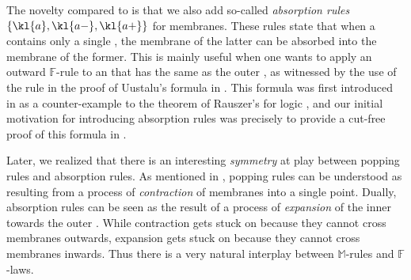 \begin{description}
  The novelty compared to  is that we also add so-called
  \emph{absorption rules} $\{\kl{a},\kl{a{-}},\kl{a{+}}\}$ for membranes.
  These rules state that when a  contains only a single  ,
  the membrane of the latter can be absorbed into the membrane of the former.
  This is mainly useful when one wants to apply an outward $\mathbb{F}$-rule to
  an  that has the same  as the outer , as witnessed by the
  use of the  rule in the proof of Uustalu's formula in
  . This formula was first introduced in
   as a counter-example to the 
  theorem of Rauszer's  for  logic
  , and our initial motivation for
  introducing absorption rules was precisely to provide a cut-free proof of this
  formula in .

  Later, we realized that there is an interesting \emph{symmetry} at play
  between popping rules and absorption rules. As mentioned in
  , popping rules can be understood as resulting from a
  process of \emph{contraction} of membranes into a single point. Dually,
  absorption rules can be seen as the result of a process of \emph{expansion} of
  the inner  towards the outer . While contraction gets stuck on
    because they cannot cross  membranes outwards,
  expansion gets stuck on   because they cannot cross 
  membranes inwards. Thus there is a very natural interplay between
  $\mathbb{M}$-rules and $\mathbb{F}$-laws.
\end{description}